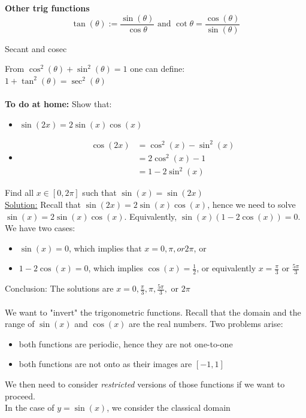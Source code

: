 \documentclass[]{article}
\begin{document}
	{\bf Other trig functions}
	$$
	\tan(\theta):=\frac{\sin(\theta)}{\cos{\theta}}\text{ and }\cot{\theta}=\frac{\cos(\theta)}{\sin(\theta)}
	$$
	\begin{center}
		Secant and cosec
	\end{center}
	From $\cos^2(\theta)+\sin^2(\theta)=1$ one can define:\\
	$1+\tan^2(\theta)=\sec^2(\theta)$\\\\
	{\bf To do at home: }
	Show that:\\
	\begin{itemize}
		\item $\sin(2x)=2\sin(x)\cos(x)$
		\item
			\begin{align*}
				\cos(2x)&=\cos^2(x)-\sin^2(x)\\
				&=2\cos^2(x)-1\\
				&=1-2\sin^2(x)
			\end{align*}
	\end{itemize}
	\pagebreak
	Find all $x\in[0,2\pi]$ such that $\sin(x)=\sin(2x)$\\
	\underline{Solution:} Recall that $\sin(2x)=2\sin(x)\cos(x)$, hence we need to solve\\
	$\sin(x)=2\sin(x)\cos(x)$. Equivalently, $\sin(x)(1-2\cos(x))=0$.\\
	We have two cases:
	\begin{itemize}
		\item $\sin(x)=0$, which implies that $x=0, \pi, or 2\pi$, or
		\item $1-2\cos(x)=0$, which implies $\cos(x)=\frac{1}{2}$, or equivalently $x=\frac{\pi}{3}$ or $\frac{5\pi}{3}$
	\end{itemize}
	Conclusion: The solutions are $x=0,\frac{\pi}{3},\pi,\frac{5\pi}{3},$ or $2\pi$\\\\
	We want to "invert" the trigonometric functions. Recall that the domain and the range of $\sin(x)$ and $\cos(x)$ are the real numbers. Two problems arise:
	\begin{itemize}
		\item both functions are periodic, hence they are not one-to-one
		\item both functions are not onto as their images are $[-1,1]$
	\end{itemize}
	We then need to consider \emph{restricted} versions of those functions if we want to proceed.\\
	In the case of $y=\sin(x)$, we consider the classical domain 
\end{document}
